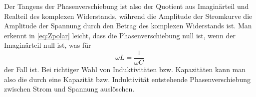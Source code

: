 Der Tangens der Phasenverschiebung ist also der Quotient aus Imaginärteil und Realteil des komplexen Widerstands, während die Amplitude der Stromkurve die Amplitude der Spannung durch den Betrag des komplexen Widerstands ist.
Man erkennt in \eqref{eq:Zpolar} leicht, dass die Phasenverschiebung null ist, wenn der Imaginärteil null ist, was für 
\begin{equation}
\omega L = \frac{1}{\omega C}
\end{equation}
der Fall ist. Bei richtiger Wahl von Induktivitäten bzw. Kapazitäten kann man also die durch eine Kapazität bzw. Induktivität entstehende Phasenverschiebung zwischen Strom und Spannung auslöschen.

